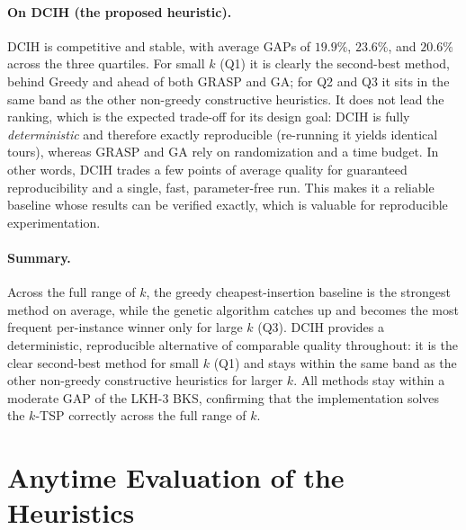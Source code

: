\documentclass[conference]{IEEEtran}
\begin{document}
\paragraph{On DCIH (the proposed heuristic).}
DCIH is competitive and stable, with average GAPs of $19.9\%$, $23.6\%$, and $20.6\%$ across the three quartiles. For small $k$ (Q1) it is clearly the second-best method, behind Greedy and ahead of both GRASP and GA; for Q2 and Q3 it sits in the same band as the other non-greedy constructive heuristics. It does not lead the ranking, which is the expected trade-off for its design goal: DCIH is fully \emph{deterministic} and therefore exactly reproducible (re-running it yields identical tours), whereas GRASP and GA rely on randomization and a time budget. In other words, DCIH trades a few points of average quality for guaranteed reproducibility and a single, fast, parameter-free run. This makes it a reliable baseline whose results can be verified exactly, which is valuable for reproducible experimentation.

\paragraph{Summary.}
Across the full range of $k$, the greedy cheapest-insertion baseline is the strongest method on average, while the genetic algorithm catches up and becomes the most frequent per-instance winner only for large $k$ (Q3). DCIH provides a deterministic, reproducible alternative of comparable quality throughout: it is the clear second-best method for small $k$ (Q1) and stays within the same band as the other non-greedy constructive heuristics for larger $k$. All methods stay within a moderate GAP of the LKH-3 BKS, confirming that the implementation solves the $k$-TSP correctly across the full range of $k$.

\section{Anytime Evaluation of the Heuristics}\label{sec:anytime}
\end{document}
